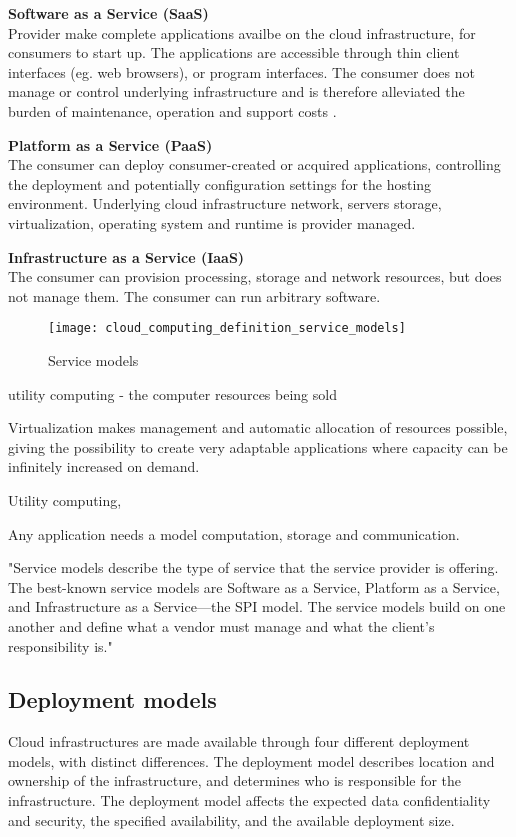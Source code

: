 \textbf{Software as a Service (SaaS)}\\
Provider make complete applications availbe on the cloud infrastructure, for consumers to start up. The applications are accessible through thin client interfaces (eg. web browsers), or program interfaces. The consumer does not manage or control underlying infrastructure and is therefore alleviated the burden of maintenance, operation and support costs \cite{youseff2008toward}.


\textbf{Platform as a Service (PaaS)}\\
The consumer can deploy consumer-created or acquired applications, controlling the deployment and potentially configuration settings for the hosting environment. Underlying cloud infrastructure network, servers storage, virtualization, operating system and runtime is provider managed.

\textbf{Infrastructure as a Service (IaaS)}\\
The consumer can provision processing, storage and network resources, but does not manage them. The consumer can run arbitrary software.

\begin{figure}[!htb]
  \texttt{[image: cloud\_computing\_definition\_service\_models]}  
  \caption{Service models}
  \label{fig:cloud_computing_definition_service_models}
\end{figure}

utility computing - the computer resources being sold

Virtualization makes management and automatic allocation of resources possible, giving the possibility to create very adaptable applications where capacity can be infinitely increased on demand\cite{armbrust2010view}.

Utility computing, 

Any application needs a model computation, storage and communication. 


"Service models describe the type of service that the service provider is offering. The best-known service models are Software as a Service, Platform as a Service, and Infrastructure as a Service—the SPI model. The service models build on one another and define what a vendor must manage and what the client’s responsibility is."


\subsection{Deployment models}
Cloud infrastructures are made available through four different deployment models, with distinct differences. The deployment model describes  location and ownership of the infrastructure, and determines who is responsible for the infrastructure. The deployment model affects the expected data confidentiality and security, the specified availability, and the available deployment size.


